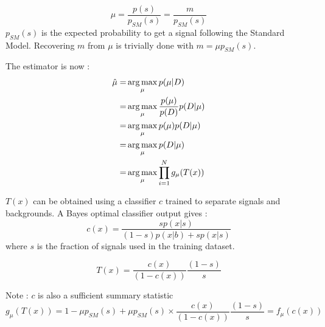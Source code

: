\begin{equation}
	\mu = \frac{p(s)}{p_{SM}(s)} = \frac{m}{p_{SM}(s)}
\end{equation}
$p_{SM}(s)$ is the expected probability to get a signal following the Standard Model.
Recovering $m$ from $\mu$ is trivially done with $m = \mu p_{SM}(s)$.

The estimator is now :
\begin{align}
	\hat\mu =& \operatorname*{arg\,max}_\mu p(\mu | D) \\
	     =& \operatorname*{arg\,max}_\mu \frac{p(\mu)}{p(D)} p(D | \mu) \\
	     =& \operatorname*{arg\,max}_\mu p(\mu) p(D | \mu) \\
	     =& \operatorname*{arg\,max}_\mu  p(D | \mu) \\
	     =& \operatorname*{arg\,max}_\mu  \prod_{i=1}^N g_\mu(T(x)) \\
\end{align}


$T(x)$ can be obtained using a classifier $c$ trained to separate signals and backgrounds.
A Bayes optimal classifier output gives :
\begin{equation}
	c(x) = \frac{s p(x|s)}{(1-s) p(x|b) + s p(x|s)}
\end{equation}
where $s$ is the fraction of signals used in the training dataset.

\begin{equation}
	T(x) = \frac{c(x)}{(1-c(x))} \frac{(1-s)}{s} 
\end{equation}


Note : $c$ is also a sufficient summary statistic
\begin{equation}
	g_\mu(T(x)) = 1 - \mu p_{SM}(s) + \mu p_{SM}(s) \times \frac{c(x)}{(1-c(x))} \frac{(1-s)}{s} = f_\mu(c(x))
\end{equation}
